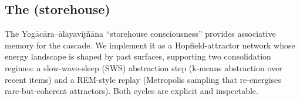 \subsection{The  (storehouse)}

The Yog\=ac\=ara--\=alayavij\~n\=ana ``storehouse consciousness'' provides associative memory for the cascade. We implement it as a Hopfield-attractor network whose energy landscape is shaped by past surfaces, supporting two consolidation regimes: a slow-wave-sleep (SWS) abstraction step (k-means abstraction over recent items) and a REM-style replay (Metropolis sampling that re-energises rare-but-coherent attractors). Both cycles are explicit and inspectable.
